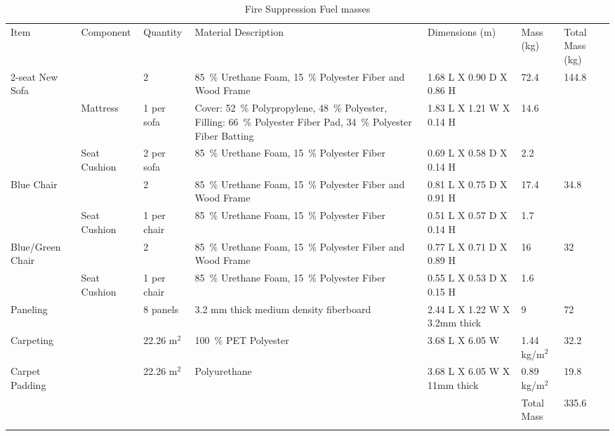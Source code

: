 \documentclass[12pt,oneside]{book}
\begin{document}
\begin{table}
	\centering
	\caption{Fire Suppression Fuel masses}
	\renewcommand{\tabcolsep}{1pt}
	\begin{tabular}{lllllll}
		\hline\noalign{\smallskip}
		Item               & Component		& Quantity		&  Material Description             							&  Dimensions (m)            	&  Mass (kg)  		& Total Mass (kg) \\
		\noalign{\smallskip}\hline\noalign{\smallskip}
		2-seat New Sofa    &				& 2				& 85~\% Urethane Foam, 15~\% Polyester Fiber and Wood Frame 	&  1.68 L X 0.90 D X 0.86 H  	&  72.4    			& 144.8 \\
		           	 	   & \multirow{2}{*}{{Mattress}}	    & \multirow{2}{*}{{1 per sofa}}	& \multirow{2}{*}{\parbox{5cm} {Cover: 52~\% Polypropylene, 48~\% Polyester, Filling: 66~\% Polyester Fiber Pad, 34~\% Polyester Fiber  Batting}} & \multirow{2}{*}{{1.83 L X 1.21 W X 0.14 H}}  & \multirow{2}{*}{{14.6}}     \\
		           	 	   &	            &               &                                                          		&                            	&             		& \\[.25cm]
			           	   & Seat Cushion	& 2 per sofa	& 85~\% Urethane Foam, 15~\% Polyester Fiber   				    &  0.69 L X 0.58 D X 0.14 H  	&  2.2     			& \\
		Blue Chair         &				& 2				& 85~\% Urethane Foam, 15~\% Polyester Fiber and Wood Frame   	&  0.81 L X 0.75 D X 0.91 H  	&  17.4    			& 34.8 \\
		    			   & Seat Cushion   & 1 per chair   & 85~\% Urethane Foam, 15~\% Polyester Fiber					&  0.51 L X 0.57 D X 0.14 H  	&  1.7    			& \\
		Blue/Green Chair   & 				& 2				& 85~\% Urethane Foam, 15~\% Polyester Fiber and Wood Frame     &  0.77 L X 0.71 D X 0.89 H  	&  16    			& 32 \\
		                   & Seat Cushion	& 1 per chair	& 85~\% Urethane Foam, 15~\% Polyester Fiber		            &  0.55 L X 0.53 D X 0.15 H  	&  1.6    			& \\
		Paneling           &				& 8 panels		& 3.2 mm thick medium density fiberboard                   		&  2.44 L X 1.22 W X 3.2mm thick&  9    			& 72 \\
		Carpeting          &				& 22.26 m$^2$	& 100~\% PET Polyester                  						&  3.68 L X 6.05 W  			&  1.44 kg/m$^2$	& 32.2 \\
		Carpet Padding     &				& 22.26 m$^2$	& Polyurethane                 	 								&  3.68 L X 6.05 W X 11mm thick &  0.89 kg/m$^2$    & 19.8 \\
		                   &                &               &                                                               &                               & Total Mass        & 335.6 \\
		\noalign{\smallskip}\hline
	\end{tabular} 
	\label{tab:Fire_Suppression_Fuel_Masses}
\end{table}
\end{document}
